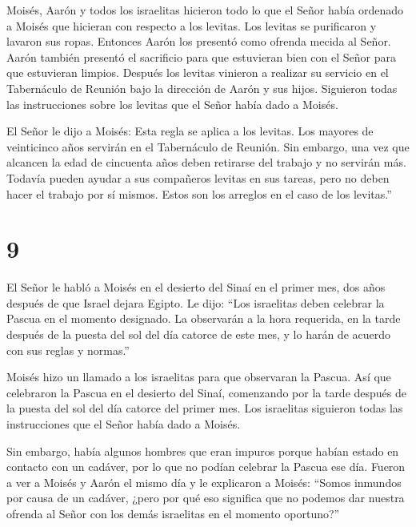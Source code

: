 Moisés, Aarón y todos los israelitas hicieron todo lo que
el Señor había ordenado a Moisés que hicieran con respecto a los
levitas.  Los levitas se purificaron y lavaron sus ropas.
Entonces Aarón los presentó como ofrenda mecida al Señor. Aarón también
presentó el sacrificio para que estuvieran bien con el Señor para que
estuvieran limpios.  Después los levitas vinieron a
realizar su servicio en el Tabernáculo de Reunión bajo la dirección de
Aarón y sus hijos. Siguieron todas las instrucciones sobre los levitas
que el Señor había dado a Moisés.

 El Señor le dijo a Moisés:  Esta regla se
aplica a los levitas. Los mayores de veinticinco años servirán en el
Tabernáculo de Reunión.  Sin embargo, una vez que alcancen
la edad de cincuenta años deben retirarse del trabajo y no servirán más.
 Todavía pueden ayudar a sus compañeros levitas en sus
tareas, pero no deben hacer el trabajo por sí mismos. Estos son los
arreglos en el caso de los levitas.''

\hypertarget{section-8}{%
\section{9}\label{section-8}}

 El Señor le habló a Moisés en el desierto del Sinaí en el
primer mes, dos años después de que Israel dejara Egipto. Le dijo:
 ``Los israelitas deben celebrar la Pascua en el momento
designado.  La observarán a la hora requerida, en la tarde
después de la puesta del sol del día catorce de este mes, y lo harán de
acuerdo con sus reglas y normas.''

 Moisés hizo un llamado a los israelitas para que observaran
la Pascua.  Así que celebraron la Pascua en el desierto del
Sinaí, comenzando por la tarde después de la puesta del sol del día
catorce del primer mes. Los israelitas siguieron todas las instrucciones
que el Señor había dado a Moisés.

 Sin embargo, había algunos hombres que eran impuros porque
habían estado en contacto con un cadáver, por lo que no podían celebrar
la Pascua ese día. Fueron a ver a Moisés y Aarón el mismo día
 y le explicaron a Moisés: ``Somos inmundos por causa de un
cadáver, ¿pero por qué eso significa que no podemos dar nuestra ofrenda
al Señor con los demás israelitas en el momento oportuno?''


